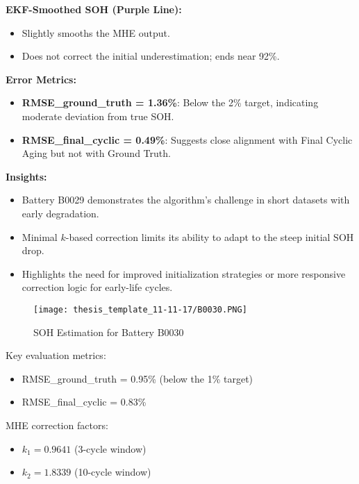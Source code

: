 \vspace{0.5em}
\textbf{EKF-Smoothed SOH (Purple Line):}
\begin{itemize}
    \item Slightly smooths the MHE output.
    \item Does not correct the initial underestimation; ends near 92\%.
\end{itemize}

\vspace{0.5em}
\textbf{Error Metrics:}
\begin{itemize}
    \item \textbf{RMSE\_ground\_truth = 1.36\%}: Below the 2\% target, indicating moderate deviation from true SOH.
    \item \textbf{RMSE\_final\_cyclic = 0.49\%}: Suggests close alignment with Final Cyclic Aging but not with Ground Truth.
\end{itemize}

\vspace{0.5em}
\textbf{Insights:}
\begin{itemize}
    \item Battery B0029 demonstrates the algorithm’s challenge in short datasets with early degradation.
    \item Minimal $k$-based correction limits its ability to adapt to the steep initial SOH drop.
    \item Highlights the need for improved initialization strategies or more responsive correction logic for early-life cycles.
\end{itemize}

\begin{figure}
    \centering
    \texttt{[image: thesis\_template\_11-11-17/B0030.PNG]}
    \caption{SOH Estimation for Battery B0030}
    \label{fig:resB0030}
\end{figure}

Key evaluation metrics:
\begin{itemize}
    \item RMSE\_ground\_truth = 0.95\% (below the 1\% target)
    \item RMSE\_final\_cyclic = 0.83\%
\end{itemize}

MHE correction factors:
\begin{itemize}
    \item $k_1 = 0.9641$ (3-cycle window)
    \item $k_2 = 1.8339$ (10-cycle window)
\end{itemize}

